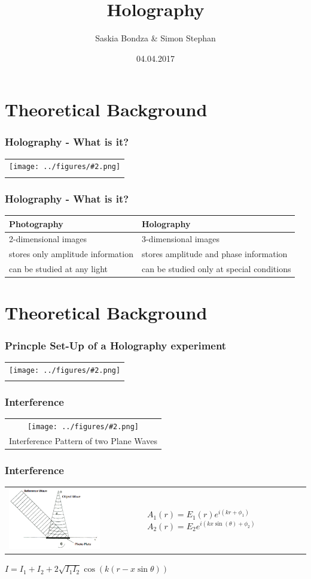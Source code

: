 \documentclass{beamer}
\title{Holography}
\author{Saskia Bondza \& Simon Stephan}
\date{04.04.2017}
\newcommand{\gra}[3][]{
	\begin{table}
	\centering
	\begin{tabular}[width=\textwidth]{c}
		\texttt{[image: ../figures/\#2.png]}\\
		\small #3
	\end{tabular}
	\end{table}
}
\begin{document}
\maketitle
\frame{\tableofcontents}
\section{Theoretical Background}
\frame{\tableofcontents[currentsection]}
\begin{frame}
	\frametitle{Holography - What is it?}
	\gra[0.7]{holo-schach}{}
\end{frame}
\begin{frame}
	\frametitle{Holography - What is it?}
	\begin{tabular}{p{5cm}|p{5cm}}
		\textbf{Photography}&\textbf{Holography}\\\hline
		2-dimensional images&3-dimensional images\\\hline
		stores only amplitude information&stores amplitude and phase information\\\hline
		can be studied at any light&can be studied only at special conditions
	\end{tabular}
\end{frame}

\section{Theoretical Background}
\frame{\tableofcontents[currentsection]}
\begin{frame}
	\frametitle{Princple Set-Up of a Holography experiment}
	\gra[0.8]{PrincipleSetUp}{}
\end{frame}
\begin{frame}
	\frametitle{Interference}
	\gra[0.7]{stripes}{Interference Pattern of two Plane Waves}
\end{frame}
\begin{frame}
	\frametitle{Interference}
	\begin{table}
		\centering
		\begin{tabular}[width=\textwidth]{m{6cm}m{4cm}}
			\includegraphics[width=0.7\textwidth]{../figures/Interference1.png}&
					$A_1(r) = E_1(r) e^{i(kr+\phi_1)}$\newline
					$A_2(r) = E_2 e^{i(kx\sin(\theta)+\phi_2)}$
		\end{tabular}
	\end{table}
	
	$I=I_1+I_2+2\sqrt{I_1I_2}\cos(k(r-x\sin\theta))$

\end{frame}
\end{document}
